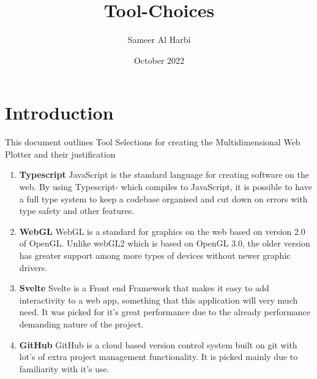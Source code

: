 \documentclass{article}
\title{Tool-Choices}
\author{Sameer Al Harbi}
\date{October 2022}
\begin{document}
\maketitle

\section{Introduction}
This document outlines Tool Selections for creating the Multidimensional Web Plotter and their justification

\begin{enumerate}
    \item \textbf{Typescript} JavaScript is the standard language for creating software on the web. By using Typescript- which compiles to JavaScript, it is possible to have a full type system to keep a codebase organised and cut down on errors with type safety and other features.
    \item \textbf{WebGL} WebGL is a standard for graphics on the web based on version 2.0 of OpenGL. Unlike webGL2 which is based on OpenGL 3.0, the older version has greater support among more types of devices without newer graphic drivers. 
    \item \textbf{Svelte} Svelte is a Front end Framework that makes it easy to add interactivity to a web app, something that this application will very much need. It was picked for it's great performance due to the already performance demanding nature of the project. 
    \item \textbf{GitHub} GitHub is a cloud based version control system built on git with lot's of extra project management functionality. It is picked mainly due to familiarity with it's use.
\end{enumerate}
\end{document}
